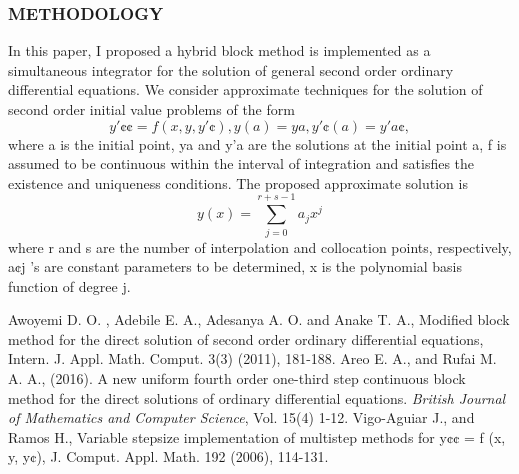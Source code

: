 \documentclass[compress, 19pt, blue]{beamer}
\begin{document}
\begin{frame}
	\frametitle{\textbf{METHODOLOGY}}
	In this paper, I proposed a hybrid block method is implemented as a simultaneous integrator for the solution of general second order ordinary differential equations. We consider approximate techniques for the solution of second order initial value problems of the form
	\begin{equation}
	y'¢¢ = f (x, y, y'¢), y(a) = ya , y'¢(a) = y'a¢ ,						 		
	\end{equation}
	where a is the initial point, ya and y'a are the solutions at the initial point a, f is assumed to be continuous within the interval of integration and satisfies the existence and uniqueness conditions. The proposed approximate solution is
	\begin{equation}
	y(x) = \sum_{j=0}^{r+s-1}a_{j}x^{j}								
	\end{equation}
	where r and s are the number of interpolation and collocation points, respectively, a¢j ’s are constant parameters to be determined, x is the polynomial basis function of degree j.
\end{frame}

%


\thebibliography{}
	Awoyemi D. O. , Adebile E. A., Adesanya A. O. and Anake T. A., Modified block method for the direct solution of second order ordinary differential equations, Intern. J. Appl. Math. Comput. 3(3) (2011), 181-188.
	Areo E. A., and Rufai M. A. A., (2016). A new uniform fourth order one-third step continuous block method for the direct solutions of ordinary differential equations. \textit{British Journal of Mathematics and Computer Science}, Vol. 15(4) 1-12.
Vigo-Aguiar J., and Ramos H., Variable stepsize implementation of multistep methods for y¢¢ = f (x, y, y¢), J. Comput. Appl. Math. 192 (2006), 114-131.
\end{document}
